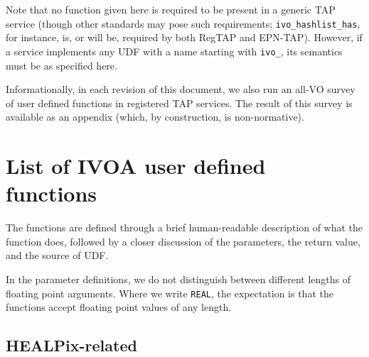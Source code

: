 \documentclass[11pt,a4paper]{ivoa}
\begin{document}
Note that no function given here is required to be present in a generic
TAP service (though other standards may pose such requirements;
\verb|ivo_hashlist_has|, for instance, is, or will be, required by both
RegTAP and EPN-TAP).  However, if a service implements any UDF with a
name starting with \verb|ivo_|, its semantics must be as specified here.

Informationally, in each revision of this document, we also run an
all-VO survey of user defined functions in registered TAP services.  The
result of this survey is available as an appendix (which, by
construction, is non-normative).







\section{List of IVOA user defined functions}

The functions are defined through a brief human-readable description of
what the function does, followed by a closer discussion of the
parameters, the return value, and the source of UDF.

In the parameter definitions, we do not distinguish between different
lengths of floating point arguments.  Where we write \texttt{REAL}, the
expectation is that the functions accept floating point values of any
length.


\subsection{HEALPix-related}
\end{document}
